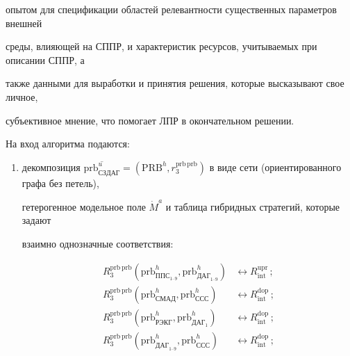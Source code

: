 опытом для спецификации областей релевантности существенных параметров внешней


среды, влияющей на СППР, и характеристик ресурсов, учитываемых при описании СППР, а


также данными для выработки и принятия решения, которые высказывают свое личное,


субъективное мнение, что помогает ЛПР в окончательном решении.





 На вход алгоритма подаются:


 \begin{enumerate}[(1)]


\item декомпозиция $\overline{\mathrm{prb}^u_{\mathrm{СЗДАГ}}}= \left( \mathrm{PRB}^h,


r_3^{\mathrm{prb\,prb}}\right)$ в виде сети (ориентированного графа без петель),


гетерогенное модельное поле $\dot{M}^a$ и таблица гибридных стратегий, которые задают


взаимно однозначные соответствия:


\begin{align*}


R_3^{\mathrm{prb\,prb}}\left(


\mathrm{prb}^h_{\mathrm{ППС}_{1\mbox{--}9}},


\mathrm{prb}^h_{\mathrm{ДАГ}_{1\mbox{--}9}}\right) &\leftrightarrow R^{\mathrm{upr}}_{\mathrm{int}}\,;\\


R_3^{\mathrm{prb\,prb}}\left(


\mathrm{prb}^h_{\mathrm{СМАД}},\mathrm{prb}^h_{\mathrm{ССС}}\right) &\leftrightarrow


R_{\mathrm{int}}^{\mathrm{dop}}\,;\\


R_3^{\mathrm{prb\,prb}}\left(


\mathrm{prb}^h_{\mathrm{РЭКГ}},\mathrm{prb}^h_{\mathrm{ДАГ}_1}\right)& \leftrightarrow


R_{\mathrm{int}}^{\mathrm{dop}}\,;\\


R_3^{\mathrm{prb\,prb}}\left(


\mathrm{prb}^h_{\mathrm{ДАГ}_{1\mbox{--}9}},\mathrm{prb}^h_{\mathrm{ССС}}\right)


&\leftrightarrow R_{\mathrm{int}}^{\mathrm{dop}}\,;



\end{align*}
\end{enumerate}
